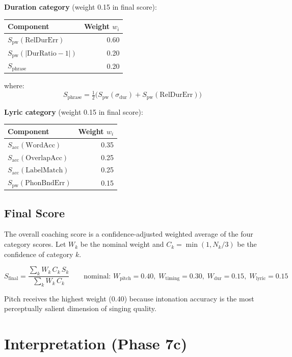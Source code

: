 \documentclass[11pt,letterpaper]{article}
\begin{document}
\textbf{Duration category} (weight 0.15 in final score):
\begin{center}
  \begin{tabular}{@{}lr@{}}
    \toprule
    Component & Weight $w_i$ \\
    \midrule
    $S_\text{pw}(\mathrm{RelDurErr})$ & 0.60 \\
    $S_\text{pw}(|\mathrm{DurRatio}-1|)$ & 0.20 \\
    $S_\text{phrase}$ & 0.20 \\
    \bottomrule
  \end{tabular}
\end{center}
where:
\[
  S_\text{phrase}
    = \tfrac{1}{2}\bigl(S_\text{pw}(\sigma_\text{dur})
    + S_\text{pw}(\mathrm{RelDurErr})\bigr)
\]

\textbf{Lyric category} (weight 0.15 in final score):
\begin{center}
  \begin{tabular}{@{}lr@{}}
    \toprule
    Component & Weight $w_i$ \\
    \midrule
    $S_\text{acc}(\mathrm{WordAcc})$    & 0.35 \\
    $S_\text{acc}(\mathrm{OverlapAcc})$ & 0.25 \\
    $S_\text{acc}(\mathrm{LabelMatch})$ & 0.25 \\
    $S_\text{pw}(\mathrm{PhonBndErr})$  & 0.15 \\
    \bottomrule
  \end{tabular}
\end{center}

\subsection{Final Score}

The overall coaching score is a confidence-adjusted weighted average of the
four category scores.
Let $W_k$ be the nominal weight and $C_k = \min(1, N_k/3)$ be the confidence
of category $k$.

\[
  \boxed{S_\text{final}
    = \frac{\sum_k W_k\,C_k\,S_k}{\sum_k W_k\,C_k}}
  \qquad
  \text{nominal: } W_\text{pitch}=0.40,\;
    W_\text{timing}=0.30,\;
    W_\text{dur}=0.15,\;
    W_\text{lyric}=0.15
\]

Pitch receives the highest weight (0.40) because intonation accuracy is
the most perceptually salient dimension of singing quality.

\section{Interpretation (Phase 7c)}
\end{document}
